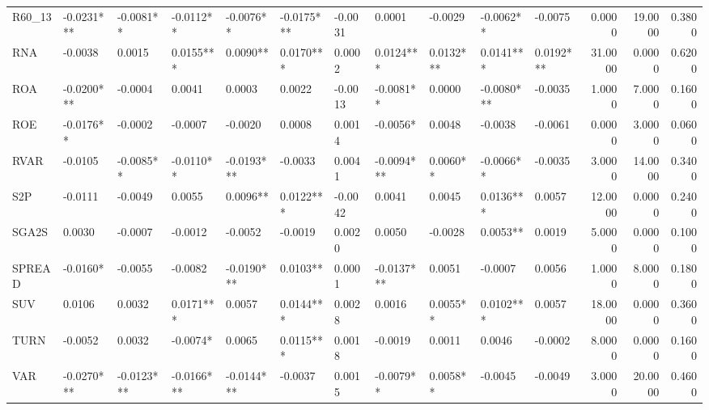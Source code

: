 \begin{tabular}{lllllllllllrrr}
R60\_13  &  -0.0231*** &   -0.0081** &   -0.0112** &   -0.0076** &  -0.0175*** &    -0.0031 &      0.0001 &    -0.0029 &   -0.0062** &     -0.0075 &   0.0000 &  19.0000 &   0.3800 \\
RNA     &     -0.0038 &      0.0015 &   0.0155*** &    0.0090** &   0.0170*** &     0.0002 &   0.0124*** &  0.0132*** &   0.0141*** &   0.0192*** &  31.0000 &   0.0000 &   0.6200 \\
ROA     &  -0.0200*** &     -0.0004 &      0.0041 &      0.0003 &      0.0022 &    -0.0013 &   -0.0081** &     0.0000 &  -0.0080*** &     -0.0035 &   1.0000 &   7.0000 &   0.1600 \\
ROE     &   -0.0176** &     -0.0002 &     -0.0007 &     -0.0020 &      0.0008 &     0.0014 &    -0.0056* &     0.0048 &     -0.0038 &     -0.0061 &   0.0000 &   3.0000 &   0.0600 \\
RVAR    &     -0.0105 &   -0.0085** &   -0.0110** &  -0.0193*** &     -0.0033 &     0.0041 &  -0.0094*** &   0.0060** &   -0.0066** &     -0.0035 &   3.0000 &  14.0000 &   0.3400 \\
S2P     &     -0.0111 &     -0.0049 &      0.0055 &    0.0096** &   0.0122*** &    -0.0042 &      0.0041 &     0.0045 &   0.0136*** &      0.0057 &  12.0000 &   0.0000 &   0.2400 \\
SGA2S   &      0.0030 &     -0.0007 &     -0.0012 &     -0.0052 &     -0.0019 &     0.0020 &      0.0050 &    -0.0028 &    0.0053** &      0.0019 &   5.0000 &   0.0000 &   0.1000 \\
SPREAD  &    -0.0160* &     -0.0055 &     -0.0082 &  -0.0190*** &    0.0103** &     0.0001 &  -0.0137*** &     0.0051 &     -0.0007 &      0.0056 &   1.0000 &   8.0000 &   0.1800 \\
SUV     &      0.0106 &      0.0032 &   0.0171*** &      0.0057 &   0.0144*** &     0.0028 &      0.0016 &   0.0055** &   0.0102*** &      0.0057 &  18.0000 &   0.0000 &   0.3600 \\
TURN    &     -0.0052 &      0.0032 &    -0.0074* &      0.0065 &   0.0115*** &     0.0018 &     -0.0019 &     0.0011 &      0.0046 &     -0.0002 &   8.0000 &   0.0000 &   0.1600 \\
VAR     &  -0.0270*** &  -0.0123*** &  -0.0166*** &  -0.0144*** &     -0.0037 &     0.0015 &   -0.0079** &   0.0058** &     -0.0045 &     -0.0049 &   3.0000 &  20.0000 &   0.4600 \\
\bottomrule
\end{tabular}
